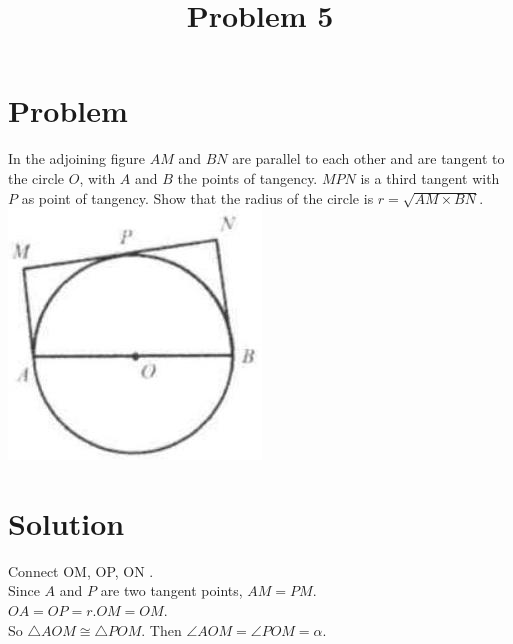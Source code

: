 \documentclass{article}
\title{Problem 5}
\date{}
\begin{document}
\maketitle

\section*{Problem}
In the adjoining figure \(A M\) and \(B N\) are parallel to each other and are tangent to the circle \(O\), with \(A\) and \(B\) the points of tangency. \(M P N\) is a third tangent with \(P\) as point of tangency. Show that the radius of the circle is \(r=\sqrt{A M \times B N}\).\\
\centering
\includegraphics[width=\textwidth]{images/problem_image_1.jpg}

\section*{Solution}
Connect OM, OP, ON .\\
Since \(A\) and \(P\) are two tangent points, \(A M=P M\).\\
\(O A=O P=r . O M=O M\).\\
So \(\triangle A O M \cong \triangle P O M\). Then \(\angle A O M=\angle P O M=\alpha\).
\end{document}
